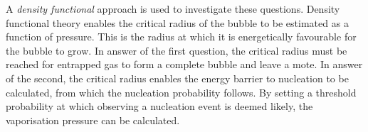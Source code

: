 A {\em density functional} approach is used to investigate these questions.
Density functional theory enables the critical radius of the bubble
to be estimated as a function of pressure.
This is the radius at which it is energetically favourable for the bubble to grow.
In answer of the first question, 
the critical radius must be reached for entrapped gas to form a complete bubble and leave a mote.
In answer of the second, the critical radius enables the energy barrier to nucleation to be calculated,
from which the nucleation probability follows.
By setting a threshold probability at which observing a nucleation event is deemed likely,
the vaporisation pressure can be calculated.
% 
%
%
%
%
%
%

% 

